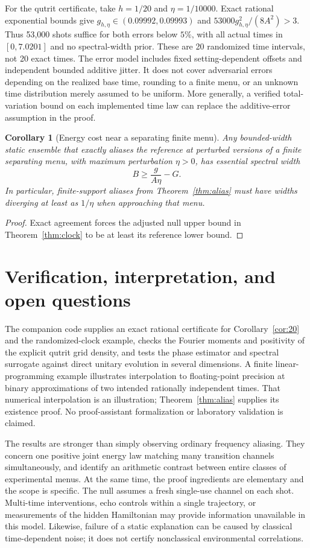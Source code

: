 \documentclass[11pt,a4paper]{article}
\newtheorem{corollary}[theorem]{Corollary}
\theoremstyle{remark}\newtheorem{remark}[theorem]{Remark}
\begin{document}
For the qutrit certificate, take $h=1/20$ and $\eta=1/10000$.
Exact rational exponential bounds give
$g_{h,\eta}\in(0.09992,0.09993)$ and
$53000g_{h,\eta}^2/(8A^2)>3$. Thus 53,000 shots suffice for both
errors below $5\%$, with all actual times in $[0,7.0201]$ and no
spectral-width prior. These are 20 randomized time intervals, not 20
exact times. The error model includes fixed setting-dependent offsets
and independent bounded additive jitter. It does not cover adversarial
errors depending on the realized base time, rounding to a finite menu,
or an unknown time distribution merely assumed to be uniform.
More generally, a verified total-variation bound on each implemented
time law can replace the additive-error assumption in the proof.

\begin{corollary}[Energy cost near a separating finite menu]
Any bounded-width static ensemble that exactly aliases the reference
at perturbed versions of a finite separating menu, with maximum
perturbation $\eta>0$, has essential spectral width
\[
 B\geq\frac{g}{A\eta}-G.
\]
In particular, finite-support aliases from Theorem~\ref{thm:alias}
must have widths diverging at least as $1/\eta$ when approaching that
menu.
\end{corollary}
\begin{proof}
Exact agreement forces the adjusted null upper bound in
Theorem~\ref{thm:clock} to be at least its reference lower bound.
\end{proof}

\section{Verification, interpretation, and open questions}
The companion code supplies an exact rational certificate for
Corollary~\ref{cor:20} and the randomized-clock example, checks the Fourier moments and positivity of the
explicit qutrit grid density, and tests the phase estimator and spectral
surrogate against direct unitary evolution in several dimensions. A
finite linear-programming example illustrates interpolation to
floating-point precision at binary approximations of two intended
rationally independent times. That numerical interpolation is an
illustration; Theorem~\ref{thm:alias} supplies its existence proof.
No proof-assistant formalization or laboratory validation is claimed.

The results are stronger than simply observing ordinary frequency
aliasing. They concern one positive joint energy law matching many
transition channels simultaneously, and identify an arithmetic contrast
between entire classes of experimental menus. At the same time, the
proof ingredients are elementary and the scope is specific. The null
assumes a fresh single-use channel on each shot. Multi-time interventions,
echo controls within a single trajectory, or measurements of the hidden
Hamiltonian may provide information unavailable in this model. Likewise,
failure of a static explanation can be caused by classical time-dependent
noise; it does not certify nonclassical environmental correlations.
\end{document}
